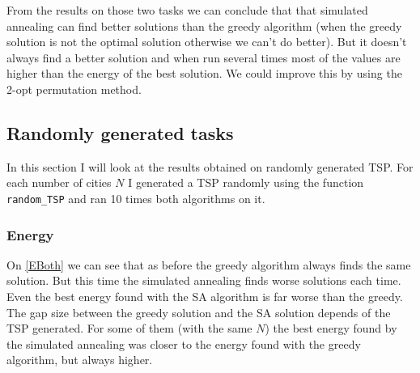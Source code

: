 \documentclass[14pt]
{article}
\begin{document}
From the results on those two tasks we can conclude that that simulated annealing can find better solutions than the greedy algorithm (when the greedy solution is not the optimal solution otherwise we can't do better). But it doesn't always find a better solution and when run several times most of the values are higher than the energy of the best solution. We could improve this by using the 2-opt permutation method.

\subsection{Randomly generated tasks}
In this section I will look at the results obtained on randomly generated TSP. For each number of cities $N$ I generated a TSP randomly using the function \texttt{random\_TSP} and ran 10 times both algorithms on it. 

\subsubsection{Energy}
On \autoref{EBoth} we can see that as before the greedy algorithm always finds the same solution. But this time the simulated annealing finds worse solutions each time. Even the best energy found with the SA algorithm is far worse than the greedy.\\
The gap size between the greedy solution and the SA solution depends of the TSP generated. For some of them (with the same $N$) the best energy found by the simulated annealing was closer to the energy found with the greedy algorithm, but always higher.\\
\end{document}
